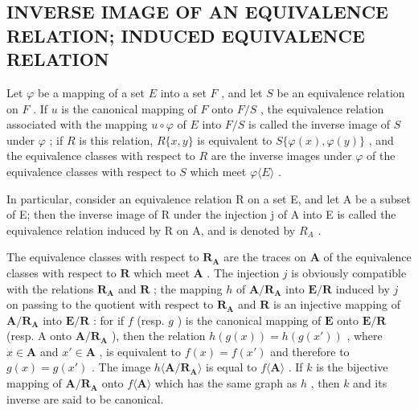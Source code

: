 \subsection{INVERSE IMAGE OF AN EQUIVALENCE RELATION; INDUCED EQUIVALENCE RELATION}

Let \(\varphi\) be a mapping of a set \(E\) into a set \(F\) , and let \(S\) be an equivalence relation on \(F\) . If \(u\) is the canonical mapping of \(F\) onto \(F/S\) , the equivalence relation associated with the mapping \(u \circ \varphi\) of \(E\) into \(F/S\) is called the inverse image of \(S\) under \(\varphi\) ; if \(R\) is this relation, \(R\{x, y\}\) is equivalent to \(S\{\varphi(x), \varphi(y)\}\) , and the equivalence classes with respect to \(R\) are the inverse images under \(\varphi\) of the equivalence classes with respect to \(S\) which meet \(\varphi\langle E\rangle\) .

In particular, consider an equivalence relation R on a set E, and let A be a subset of E; then the inverse image of R under the injection j of A into E is called the equivalence relation induced by R on A, and is denoted by \(R_{A}\) .

The equivalence classes with respect to \(\mathbf{R}_{\mathbf{A}}\) are the traces on \(\mathbf{A}\) of the equivalence classes with respect to \(\mathbf{R}\) which meet \(\mathbf{A}\) . The injection \(j\) is obviously compatible with the relations \(\mathbf{R}_{\mathbf{A}}\) and \(\mathbf{R}\) ; the mapping \(h\) of \(\mathbf{A} / \mathbf{R}_{\mathbf{A}}\) into \(\mathbf{E} / \mathbf{R}\) induced by \(j\) on passing to the quotient with respect to \(\mathbf{R}_{\mathbf{A}}\) and \(\mathbf{R}\) is an injective mapping of \(\mathbf{A} / \mathbf{R}_{\mathbf{A}}\) into \(\mathbf{E} / \mathbf{R}\) : for if \(f\) (resp. \(g\) ) is the canonical mapping of \(\mathbf{E}\) onto \(\mathbf{E} / \mathbf{R}\) (resp. A onto \(\mathbf{A} / \mathbf{R}_{\mathbf{A}}\) ), then the relation \(h(g(x)) = h(g(x'))\) , where \(x \in \mathbf{A}\) and \(x' \in \mathbf{A}\) , is equivalent to \(f(x) = f(x')\) and therefore to \(g(x) = g(x')\) . The image \(h\langle \mathbf{A} / \mathbf{R}_{\mathbf{A}} \rangle\) is equal to \(f\langle \mathbf{A} \rangle\) . If \(k\) is the bijective mapping of \(\mathbf{A} / \mathbf{R}_{\mathbf{A}}\) onto \(f\langle \mathbf{A} \rangle\) which has the same graph as \(h\) , then \(k\) and its inverse are said to be canonical.

